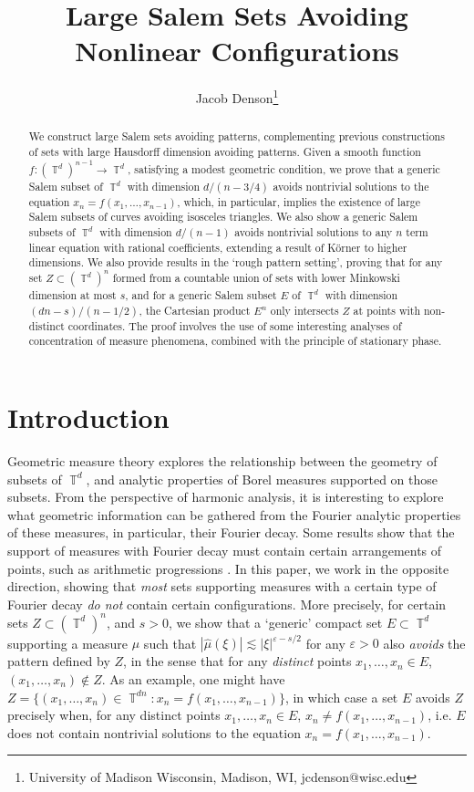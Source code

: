 \documentclass[dvipsnames,letterpaper,12pt]{article}
\title{Large Salem Sets Avoiding Nonlinear Configurations}
\author{Jacob Denson\footnote{University of Madison Wisconsin, Madison, WI, jcdenson@wisc.edu}}
\numberwithin{equation}{section}
\DeclareMathOperator{\TT}{\mathbb{T}}
\numberwithin{theorem}{section}
\begin{document}
\maketitle

\begin{abstract}
    We construct large Salem sets avoiding patterns, complementing previous constructions of sets with large Hausdorff dimension avoiding patterns. Given a smooth function $f: (\TT^d)^{n-1} \to \TT^d$, satisfying a modest geometric condition, we prove that a generic Salem subset of $\TT^d$ with dimension $d/(n-3/4)$ avoids nontrivial solutions to the equation $x_n = f(x_1,\dots,x_{n-1})$, which, in particular, implies the existence of large Salem subsets of curves avoiding isosceles triangles. We also show a generic Salem subsets of $\TT^d$ with dimension $d/(n-1)$ avoids nontrivial solutions to any $n$ term linear equation with rational coefficients, extending a result of K\"{o}rner to higher dimensions. We also provide results in the `rough pattern setting', proving that for any set $Z \subset (\TT^d)^n$ formed from a countable union of sets with lower Minkowski dimension at most $s$, and for a generic Salem subset $E$ of $\TT^d$ with dimension $(dn-s) / (n-1/2)$, the Cartesian product $E^n$ only intersects $Z$ at points with non-distinct coordinates. The proof involves the use of some interesting analyses of concentration of measure phenomena, combined with the principle of stationary phase.
\end{abstract}

\section{Introduction}

Geometric measure theory explores the relationship between the geometry of subsets of $\TT^d$, and analytic properties of Borel measures supported on those subsets. From the perspective of harmonic analysis, it is interesting to explore what geometric information can be gathered from the Fourier analytic properties of these measures, in particular, their Fourier decay. Some results show that the support of measures with Fourier decay must contain certain arrangements of points, such as arithmetic progressions \cite{ChanLabaPramanik, HenriotLabaPramanik,LabaPramanik}. In this paper, we work in the opposite direction, showing that \emph{most} sets supporting measures with a certain type of Fourier decay \emph{do not} contain certain configurations. More precisely, for certain sets $Z \subset (\TT^d)^n$, and $s > 0$, we show that a `generic' compact set $E \subset \TT^d$ supporting a measure $\mu$ such that $|\widehat{\mu}(\xi)| \lesssim |\xi|^{\varepsilon -s/2}$ for any $\varepsilon > 0$ also \emph{avoids} the pattern defined by $Z$, in the sense that for any \emph{distinct} points $x_1,\dots,x_n \in E$, $(x_1,\dots,x_n) \not \in Z$. As an example, one might have $Z = \{ (x_1,\dots,x_n) \in \TT^{dn}: x_n = f(x_1,\dots,x_{n-1}) \}$, in which case a set $E$ avoids $Z$ precisely when, for any distinct points $x_1,\dots,x_n \in E$, $x_n \neq f(x_1,\dots,x_{n-1})$, i.e. $E$ does not contain nontrivial solutions to the equation $x_n = f(x_1,\dots,x_{n-1})$.
\end{document}
